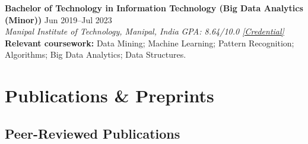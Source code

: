 \documentclass[11pt,a4paper]{article}
\newcommand{\cvEntry}[4]{\textbf{#1} \hfill #2 \\ \textit{#3} \hfill \textit{#4} \vspace{2pt}}
\begin{document}
\cvEntry{Bachelor of Technology in Information Technology (Big Data Analytics (Minor))}{Jun 2019--Jul 2023}{Manipal Institute of Technology, Manipal, India}{GPA: 8.64/10.0 \href{https://drive.google.com/file/d/1egeuz65fwpKCLLV0Bi9-n2kIEI_nJkYz/view?usp=sharing}{[Credential]}}
\\
\textbf{Relevant coursework:} Data Mining; Machine Learning; Pattern Recognition; Algorithms; Big Data Analytics; Data Structures.
\vspace{6pt}

\section{Publications \& Preprints}

\subsection*{Peer-Reviewed Publications}
\end{document}
